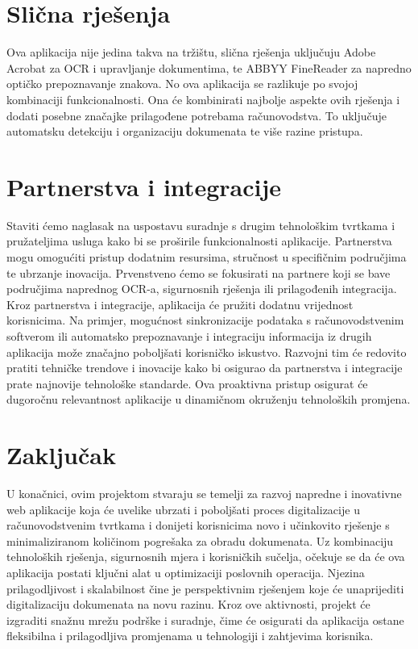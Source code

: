		\section{Slična rješenja}
		
		Ova aplikacija nije jedina takva na tržištu, slična rješenja uključuju Adobe Acrobat za OCR i upravljanje dokumentima, te ABBYY FineReader za napredno optičko prepoznavanje znakova. No ova aplikacija se razlikuje po svojoj kombinaciji funkcionalnosti. Ona će kombinirati najbolje aspekte ovih rješenja i dodati posebne značajke prilagođene potrebama računovodstva. To uključuje automatsku detekciju i organizaciju dokumenata te više razine pristupa.

		\section{Partnerstva i integracije}

		Staviti ćemo naglasak na uspostavu suradnje s drugim tehnološkim tvrtkama i pružateljima usluga kako bi se proširile funkcionalnosti aplikacije. Partnerstva mogu omogućiti pristup dodatnim resursima, stručnost u specifičnim područjima te ubrzanje inovacija.
		Prvenstveno ćemo se fokusirati na partnere koji se bave područjima naprednog OCR-a, sigurnosnih rješenja ili prilagođenih integracija. Kroz partnerstva i integracije, aplikacija će pružiti dodatnu vrijednost korisnicima. Na primjer, mogućnost sinkronizacije podataka s računovodstvenim softverom ili automatsko prepoznavanje i integraciju informacija iz drugih aplikacija može značajno poboljšati korisničko iskustvo.				 Razvojni tim će redovito pratiti tehničke trendove i inovacije kako bi osigurao da partnerstva i integracije prate najnovije tehnološke standarde. Ova proaktivna pristup osigurat će dugoročnu relevantnost aplikacije u dinamičnom okruženju tehnoloških promjena.
		
		\section{Zaključak}
		
		U konačnici, ovim projektom  stvaraju se temelji za razvoj napredne i inovativne web aplikacije koja će uvelike ubrzati i
		poboljšati proces digitalizacije u računovodstvenim tvrtkama i donijeti korisnicima novo i učinkovito rješenje s
		minimaliziranom količinom pogrešaka za obradu dokumenata. Uz kombinaciju tehnoloških rješenja, sigurnosnih mjera i korisničkih sučelja, očekuje se da će ova aplikacija postati ključni alat u optimizaciji poslovnih operacija. 
		Njezina prilagodljivost i skalabilnost čine je perspektivnim rješenjem koje će unaprijediti digitalizaciju dokumenata na novu razinu.
		Kroz ove aktivnosti, projekt će izgraditi snažnu mrežu podrške i suradnje, čime će osigurati da aplikacija ostane fleksibilna i prilagodljiva promjenama u tehnologiji i zahtjevima korisnika.
		\eject
		
